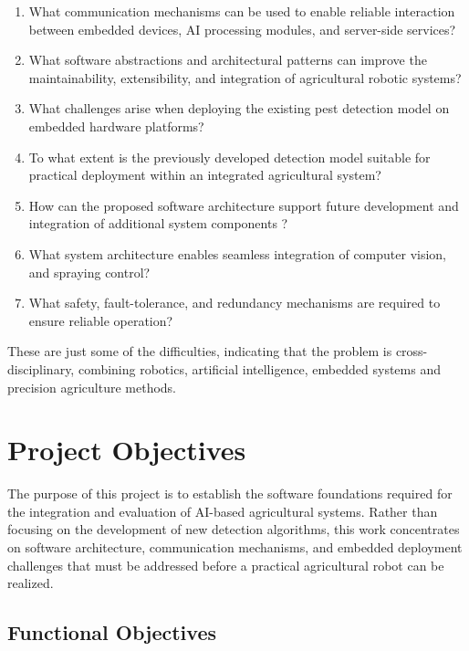 \begin{enumerate}
    \item What communication mechanisms can be used to enable reliable interaction between embedded devices, AI processing modules, and server-side services?
    
    \item What software abstractions and architectural patterns can improve the maintainability, extensibility, and integration of agricultural robotic systems?
    
    \item What challenges arise when deploying the existing pest detection model on embedded hardware platforms?
    
    \item To what extent is the previously developed detection model suitable for practical deployment within an integrated agricultural system?
    
    \item How can the proposed software architecture support future development and integration of additional system components ?
    \item What system architecture enables seamless integration of computer vision, and spraying control?
    
    \item What safety, fault-tolerance, and redundancy mechanisms are required to ensure reliable operation?
\end{enumerate}

These are just some of the difficulties, indicating that the problem is cross-disciplinary, combining robotics, artificial intelligence, embedded systems and precision agriculture methods.


\section{Project Objectives}

The purpose of this project is to establish the software foundations required for the integration and evaluation of AI-based agricultural systems. Rather than focusing on the development of new detection algorithms, this work concentrates on software architecture, communication mechanisms, and embedded deployment challenges that must be addressed before a practical agricultural robot can be realized.

\subsection{Functional Objectives}

